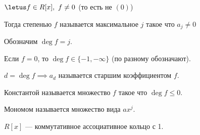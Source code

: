 \begin{defn}
    $\letus f \in R[x],~f \neq 0$ (то есть не $(0)$)

    Тогда степенью $f$ называется максимальное $j$ такое что $a_j \neq 0$

    Обозначим $\deg f = j$.

    Если $f = 0$, то $\deg f \in \{-1, -\infty\}$ (по разному обозначают).
\end{defn}

\begin{defn}
    $d = \deg f \implies a_d$ называется старшим коэффициентом $f$.
\end{defn}

\begin{defn}
    Константой называется множество $f$ такое что $\deg f \leq 0$.
\end{defn}

\begin{defn}
    Мономом называется множество вида $a x^j$.
\end{defn}

\begin{theorem-non}
    $R[x]$ --- коммутативное ассоциативное кольцо с 1.
\end{theorem-non}

